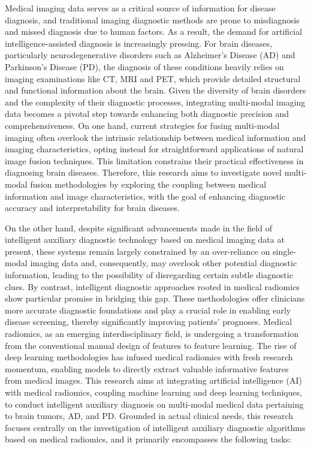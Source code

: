 \clearpage{\cleardoublepage}
\newpage

\begin{englishabstract}
Medical imaging data serves as a critical source of information for disease diagnosis, and traditional imaging diagnostic methods are prone to misdiagnosis and missed diagnosis due to human factors. As a result, the demand for artificial intelligence-assisted diagnosis is increasingly pressing. For brain diseases, particularly neurodegenerative disorders such as Alzheimer's Disease (AD) and Parkinson's Disease (PD), the diagnosis of these conditions heavily relies on imaging examinations like CT, MRI and PET, which provide detailed structural and functional information about the brain.
Given the diversity of brain disorders and the complexity of their diagnostic processes, integrating multi-modal imaging data becomes a pivotal step towards enhancing both diagnostic precision and comprehensiveness. On one hand, current strategies for fusing multi-modal imaging often overlook the intrinsic relationship between medical information and imaging characteristics, opting instead for straightforward applications of natural image fusion techniques. This limitation constrains their practical effectiveness in diagnosing brain diseases. Therefore, this research aims to
investigate novel multi-modal fusion methodologies by exploring the coupling between medical information and image characteristics, with the goal of enhancing diagnostic accuracy and interpretability for brain diseases. 

On the other hand, despite significant advancements made in the field of intelligent auxiliary diagnostic technology based on medical imaging data at present, these systems remain largely constrained by an over-reliance on single-modal imaging data and, consequently, may overlook other potential diagnostic information, leading to the possibility of disregarding certain subtle diagnostic clues. By contrast, intelligent diagnostic approaches rooted in medical radiomics show particular promise in bridging this gap. These methodologies offer clinicians more accurate diagnostic foundations and play a crucial role in enabling early disease screening, thereby significantly improving patients' prognoses.
Medical radiomics, as an emerging interdisciplinary field, is undergoing a transformation from the conventional manual design of features to feature learning. The rise of deep learning methodologies has infused medical radiomics with fresh research momentum, enabling models to directly extract valuable informative features from medical images. This research aims at integrating artificial intelligence (AI) with medical radiomics, coupling machine learning and deep learning techniques, to conduct intelligent auxiliary diagnosis on multi-modal medical data pertaining to brain tumors, AD, and PD.
Grounded in actual clinical needs, this research focuses centrally on the investigation of intelligent auxiliary diagnostic algorithms based on medical radiomics, and it primarily encompasses the following tasks: 


\end{englishabstract}
